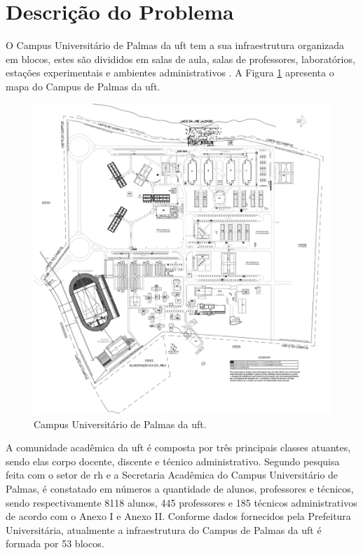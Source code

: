 \section{Descrição do Problema}

\noindent O Campus Universitário de Palmas da \gls{uft} tem a sua infraestrutura organizada em blocos, estes são divididos em salas de aula, salas de professores, laboratórios, estações experimentais e ambientes administrativos \cite{infra-uft}. A Figura \ref{fig-campus-palmas} apresenta o mapa do Campus de Palmas da \acrshort{uft}.

\begin{figure}[!h]
  \centering
  \includegraphics[width=.75\textwidth]{figuras/mapa.png} 
  \caption{Campus Universitário de Palmas da \acrshort{uft}.}
  \label{fig-campus-palmas} 
\end{figure}

A comunidade acadêmica da \acrshort{uft} é composta por três principais classes atuantes, sendo elas corpo docente, discente e técnico administrativo. Segundo pesquisa feita com o setor de \gls{rh} e a Secretaria Acadêmica do Campus Universitário de Palmas, é constatado em números a quantidade de alunos, professores e técnicos, sendo respectivamente 8118 alunos, 445 professores e 185 técnicos administrativos de acordo com o Anexo I e Anexo II. Conforme dados fornecidos pela Prefeitura Universitária, atualmente a infraestrutura do Campus de Palmas da \acrshort{uft} é formada por 53 blocos.

